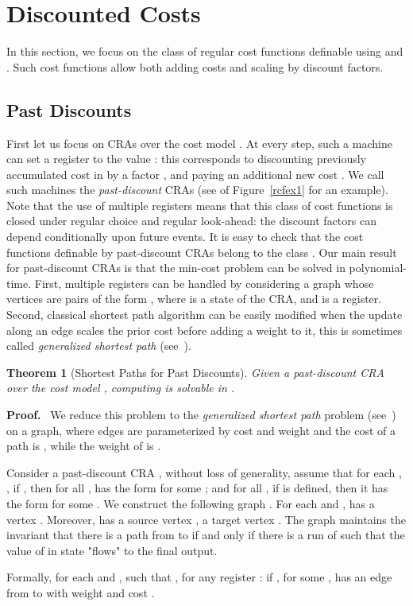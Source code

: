 \documentclass[11pt]{article}
\newtheorem{theorem}{Theorem}
\def\Proof{{\bf Proof.}}
\newcommand{\mypar}[1]{\subsection{#1}}
\newcommand{\loris}[1]{}
\begin{document}
\section{Discounted Costs}\label{sec:disc}
In this section, we focus on the class of regular cost functions
definable using  and . Such cost functions allow both adding
costs and scaling by discount factors.

\mypar{Past Discounts} First let us focus on CRAs over the cost
model . At every step, such a
machine can set a register  to the value : this
corresponds to discounting previously accumulated cost in  by a
factor , and paying an additional new cost . We call such
machines the {\em past-discount} CRAs (see  of
Figure~\ref{rcfex1} for an example). Note that the use of multiple
registers means that this class of cost functions is closed under
regular choice and regular look-ahead: the discount factors can
depend conditionally upon future events. It is easy to check that
the cost functions definable by past-discount CRAs belong to the
class . Our main result for past-discount CRAs is
that the min-cost problem can be solved in polynomial-time. First,
multiple registers can be handled by considering a graph whose
vertices are pairs of the form , where  is a state of the
CRA, and  is a register. Second, classical shortest path
algorithm can be easily modified when the update along an edge
scales the prior cost before adding a weight to it, this is
sometimes called {\em generalized shortest path\/}
(see~\cite{batagelj_generalized_2000,oldham_combinatorial_1999}).

\newcommand{\fp}{f_{pd}}
\newcommand{\ff}{f_{fd}}

\begin{theorem}[Shortest Paths for Past Discounts]
Given a past-discount CRA  over the cost model
, computing  is
solvable in .
\end{theorem}
\Proof~
We reduce this problem to the {\em generalized shortest path\/}
 problem (see~\cite{batagelj_generalized_2000,oldham_combinatorial_1999}) on a graph, where edges are parameterized
 by cost  and weight  and the cost of a path  is
, while the weight of  is .

Consider a past-discount CRA ,
without loss of generality, assume that for each , , if , then
for all ,  has the form  for some ; and for all ,
if  is defined, then it has the form  for some .
We construct the following graph . For each  and ,  has a vertex .
Moreover,  has a source vertex , a target vertex . The graph  maintains the invariant that
there is a path from  to  if and only if there is a run of  such that the value of  in state  "flows" to the
final output.
\loris{This invariant is too informal, you should say something like:
The graph  maintains the invariant that
there is a path  from  to 
if and only if there exists a string 
such that  on  reaches the configuration 
and  (or something like that).
}
Formally, for each  and , such that
, for any register :
if , for some ,  has an
edge  from  to  with weight  and  cost .
\end{document}
